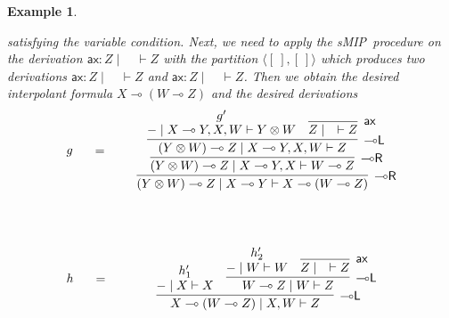 \documentclass[sn-mathphys-num]{sn-jnl}%
\newcommand{\vd}{\vdash}
\newcommand{\tr}{\otimes\mathsf{R}}
\newcommand{\pass}{\mathsf{pass}}
\newcommand{\ax}{\mathsf{ax}}
\newcommand{\ot}{\otimes}
\newcommand{\lolli}{\multimap}
\newcommand{\lleft}{{\lolli}\mathsf{L}}
\newcommand{\lright}{{\lolli}\mathsf{R}}
\newcommand{\sMIP}{\textsf{sMIP}}
\theoremstyle{thmstyleone}%
\theoremstyle{thmstyletwo}%
\newtheorem{example}[theorem]{Example}%
\theoremstyle{thmstylethree}%
\begin{document}
\begin{example}
\begin{itemize}
  \end{itemize}
  satisfying the variable condition.
  Next, we need to apply the \sMIP~procedure on the derivation $\ax : Z \mid \quad \vd Z$ with the partition $\langle [\ ] , [\ ] \rangle$ which produces two derivations $\ax : Z \mid \quad \vd Z$ and $\ax : Z \mid \quad \vd Z$.
  Then we obtain the desired interpolant formula $X \lolli (W \lolli Z)$ and the desired derivations 
  \begin{displaymath}
    \begin{array}{lc}
      \begin{array}{c}
        g
      \end{array}
      \quad
      =&
      \quad
      \begin{array}{c}
        \infer[\lright]{(Y \ot W) \lolli Z \mid X \lolli Y \vd X \lolli (W \lolli Z)}{
        \infer[\lright]{(Y \ot W) \lolli Z \mid X \lolli Y , X\vd W \lolli Z}{
        \infer[\lleft]{(Y \ot W) \lolli Z \mid X \lolli Y , X , W \vd Z}{
        \deduce{{-} \mid X \lolli Y , X , W\vd Y \ot W}{g'}
        &
        \infer[\ax]{Z \mid \quad \vd Z}{}
        }
        }
        }
      \end{array}
      \\[2.5cm]
      \begin{array}{c}
        h
      \end{array}
      \quad
      =&
      \quad
      \begin{array}{c}
        \infer[\lleft]{X \lolli (W \lolli Z) \mid X, W \vd Z}{
        \deduce{{-} \mid X \vd X}{h'_1}
        &
        \infer[\lleft]{W \lolli Z \mid W \vd Z}{
        \deduce{{-} \mid W \vd W}{h'_2}
        &
        \infer[\ax]{Z \mid \quad \vd Z}{}
        }
        }
      \end{array}
    \end{array}
  \end{displaymath}

\end{example}
\end{document}
